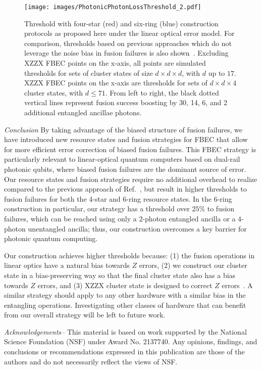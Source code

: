 \documentclass[reprint,
groupedaddress,
 prl,amsmath,amssymb,
 aps]{revtex4-2}
\theoremstyle{definition}
\begin{document}
\begin{bibunit}
\begin{figure}
    \centering
    \texttt{[image: images/PhotonicPhotonLossThreshold\_2.pdf]}
    \caption{{{Threshold with four-star (red) and six-ring (blue) construction protocols as proposed here under the linear optical error model. For comparison, thresholds based on previous approaches which do not leverage the noise bias in fusion failures is also shown~\cite{bartolucci2021fusion, auger2018fault}.}} Excluding XZZX FBEC points on the x-axis, all  points are simulated thresholds for sets of cluster states of size $d\times d \times d$, with $d$ up to $17$. XZZX FBEC points on the x-axis are thresholds for sets of $d \times d \times 4$ cluster states, with $d \leq 71$. From left to right, the black dotted vertical lines represent fusion success boosting by 30, 14, 6, and 2 additional entangled ancillae photons. }
    \label{fig:FailVsErasePlot}
\end{figure}

{\it Conclusion} By taking advantage of the biased structure of fusion failures, we have introduced new resource states and fusion strategies for FBEC that allow for more efficient error correction of biased fusion failures. This FBEC strategy is particularly relevant to linear-optical quantum computers based on dual-rail photonic qubits, where biased fusion failures are the dominant source of error. Our resource states and fusion strategies require no additional overhead to realize compared to the previous approach of Ref.~\cite{bartolucci2021fusion}, but result in higher thresholds to fusion failures for both the 4-star and 6-ring resource states. In the 6-ring construction in particular, our strategy has a threshold over $25\%$ to fusion failures, which can be reached using only a $2$-photon entangled ancilla or a $4$-photon unentangled ancilla; thus, our construction overcomes a key barrier for photonic quantum computing.

Our construction achieves higher thresholds because: (1) the fusion operations in linear optics have a natural bias towards $Z$ errors, (2) we construct our cluster state in a bias-preserving way so that the final cluster state also has a bias towards $Z$ errors, and (3) XZZX cluster state is designed to correct $Z$ errors~\cite{claes2022tailored}. A similar strategy should apply to any other hardware with a similar bias in the entangling operations. Investigating other classes of hardware that can benefit from our overall strategy will be left to future work.


\begin{acknowledgments}
{\it Acknowledgements--} This material is based on work supported by the National Science Foundation (NSF) under Award No. 2137740. Any opinions, findings, and conclusions or recommendations expressed in this publication are those of the authors and do not necessarily reflect the views of NSF.
\end{acknowledgments}

\putbib[references]
\end{bibunit}
\end{document}
